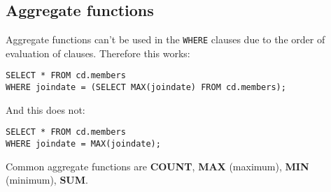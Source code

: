 %

\subsection{Aggregate functions}
Aggregate functions can't be used in the \texttt{WHERE} clauses due to the order of evaluation of clauses. Therefore this works:
\begin{verbatim}
SELECT * FROM cd.members
WHERE joindate = (SELECT MAX(joindate) FROM cd.members);
\end{verbatim}
And this does not:
\begin{verbatim}
SELECT * FROM cd.members
WHERE joindate = MAX(joindate);
\end{verbatim}

Common aggregate functions are
\textbf{COUNT},
\textbf{MAX} (maximum),
\textbf{MIN} (minimum),
\textbf{SUM}.

%